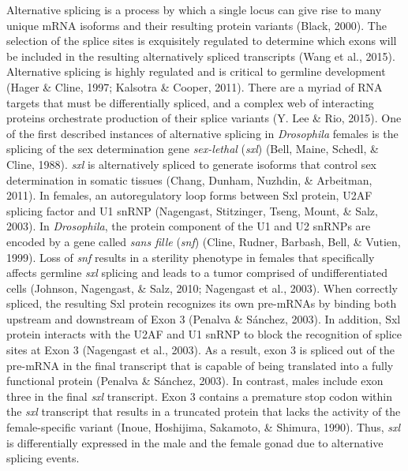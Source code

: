 \documentclass[12pt,oneside]{reedthesis}
\begin{document}
Alternative splicing is a process by which a single locus can give rise
to many unique mRNA isoforms and their resulting protein variants
(Black, 2000). The selection of the splice sites is exquisitely
regulated to determine which exons will be included in the resulting
alternatively spliced transcripts (Wang et al., 2015). Alternative splicing
is highly regulated and is critical to germline development
(Hager \& Cline, 1997; Kalsotra \& Cooper, 2011). There are a myriad of RNA targets that
must be differentially spliced, and a complex web of interacting
proteins orchestrate production of their splice variants (Y. Lee \& Rio, 2015).
One of the first described instances of alternative splicing in
\emph{Drosophila} females is the splicing of the sex determination gene
\emph{sex-lethal} (\emph{sxl}) (Bell, Maine, Schedl, \& Cline, 1988). \emph{sxl} is alternatively spliced to
generate isoforms that control sex determination in somatic tissues
(Chang, Dunham, Nuzhdin, \& Arbeitman, 2011). In females, an autoregulatory loop forms between Sxl
protein, U2AF splicing factor and U1 snRNP (Nagengast, Stitzinger, Tseng, Mount, \& Salz, 2003). In
\emph{Drosophila}, the protein component of the U1 and U2 snRNPs are encoded
by a gene called \emph{sans fille} (\emph{snf}) (Cline, Rudner, Barbash, Bell, \& Vutien, 1999). Loss of \emph{snf}
results in a sterility phenotype in females that specifically affects
germline \emph{sxl} splicing and leads to a tumor comprised of
undifferentiated cells (Johnson, Nagengast, \& Salz, 2010; Nagengast et al., 2003). When
correctly spliced, the resulting Sxl protein recognizes its own
pre-mRNAs by binding both upstream and downstream of Exon 3
(Penalva \& Sánchez, 2003). In addition, Sxl protein interacts with the U2AF and
U1 snRNP to block the recognition of splice sites at Exon 3
(Nagengast et al., 2003). As a result, exon 3 is spliced out of the pre-mRNA
in the final transcript that is capable of being translated into a fully
functional protein (Penalva \& Sánchez, 2003). In contrast, males include exon
three in the final \emph{sxl} transcript. Exon 3 contains a premature stop
codon within the \emph{sxl} transcript that results in a truncated protein
that lacks the activity of the female-specific variant (Inoue, Hoshijima, Sakamoto, \& Shimura, 1990).
Thus, \emph{sxl} is differentially expressed in the male and the female gonad
due to alternative splicing events.
\end{document}
